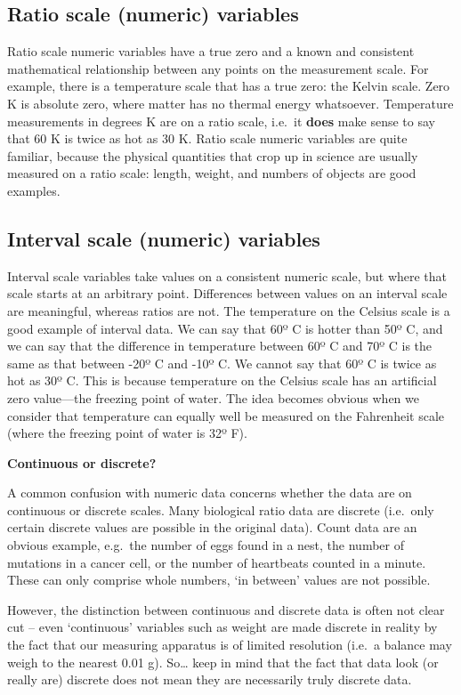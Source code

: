 \documentclass[
]{book}
\newenvironment{greybox}{
  \definecolor{shadecolor}{rgb}{0.95,0.95,0.95}  %
  \color{black}
  \begin{shaded}}
 {\end{shaded}}
\newenvironment{infobox}[1]
  {
  \begin{itemize}
  \renewcommand{\labelitemi}{
    \raisebox{-.7\height}[0pt][0pt]{
      {\setkeys{Gin}{width=3em,keepaspectratio}
        \texttt{[image: images/\#1]}}
    }
  }
  \setlength{\fboxsep}{1em}
  \begin{greybox}
  \item
  }
  {
  \end{greybox}
  \end{itemize}
  }
\begin{document}
\hypertarget{ratio-scale-numeric-variables}{%
\subsection{Ratio scale (numeric) variables}\label{ratio-scale-numeric-variables}}

Ratio scale numeric variables have a true zero and a known and consistent mathematical relationship between any points on the measurement scale. For example, there is a temperature scale that has a true zero: the Kelvin scale. Zero K is absolute zero, where matter has no thermal energy whatsoever. Temperature measurements in degrees K are on a ratio scale, i.e.~it \textbf{does} make sense to say that 60 K is twice as hot as 30 K. Ratio scale numeric variables are quite familiar, because the physical quantities that crop up in science are usually measured on a ratio scale: length, weight, and numbers of objects are good examples.

\hypertarget{interval-scale-numeric-variables}{%
\subsection{Interval scale (numeric) variables}\label{interval-scale-numeric-variables}}

Interval scale variables take values on a consistent numeric scale, but where that scale starts at an arbitrary point. Differences between values on an interval scale are meaningful, whereas ratios are not. The temperature on the Celsius scale is a good example of interval data. We can say that 60º C is hotter than 50º C, and we can say that the difference in temperature between 60º C and 70º C is the same as that between -20º C and -10º C. We cannot say that 60º C is twice as hot as 30º C. This is because temperature on the Celsius scale has an artificial zero value---the freezing point of water. The idea becomes obvious when we consider that temperature can equally well be measured on the Fahrenheit scale (where the freezing point of water is 32º F).

\begin{infobox}{information}
\textbf{Continuous or discrete?}

A common confusion with numeric data concerns whether the data are on continuous or discrete scales. Many biological ratio data are discrete (i.e.~only certain discrete values are possible in the original data). Count data are an obvious example, e.g.~the number of eggs found in a nest, the number of mutations in a cancer cell, or the number of heartbeats counted in a minute. These can only comprise whole numbers, `in between' values are not possible.

However, the distinction between continuous and discrete data is often not clear cut -- even `continuous' variables such as weight are made discrete in reality by the fact that our measuring apparatus is of limited resolution (i.e.~a balance may weigh to the nearest 0.01 g). So\ldots{} keep in mind that the fact that data look (or really are) discrete does not mean they are necessarily truly discrete data.

\end{infobox}
\end{document}
